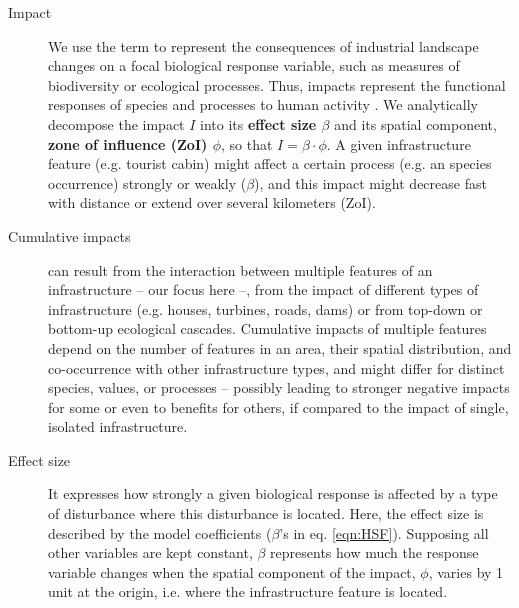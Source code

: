 \documentclass[titlepage]{article}
\begin{document}
\begin{tcolorbox}[width=1.3\textwidth,center,colback=yellow!5,colframe=yellow!75!black,title={Box 1 -- Definitions}]

\begin{description}

    \item[Impact] We use the term to represent the consequences of industrial landscape changes on a focal biological response variable, such as measures of biodiversity or ecological processes. Thus, impacts represent the functional responses of species and processes to human activity \citep{naugle_unifying_2011}. We analytically decompose the impact $I$ into its \textbf{effect size $\beta$} and its spatial component, \textbf{zone of influence (ZoI) $\phi$}, so that $I = \beta \cdot \phi$. A given infrastructure feature (e.g. tourist cabin) might affect a certain process (e.g. an species occurrence) strongly or weakly ($\beta$), and this impact might decrease fast with distance or extend over several kilometers (ZoI).
    
    \item[Cumulative impacts] can result from the interaction between multiple features of an infrastructure -- our focus here --, from the impact of different types of infrastructure (e.g. houses, turbines, roads, dams) or from top-down or bottom-up ecological cascades. Cumulative impacts of multiple features depend on the number of features in an area, their spatial distribution, and co-occurrence with other infrastructure types, and might differ for distinct species, values, or processes -- possibly leading to stronger negative impacts for some or even to benefits for others, if compared to the impact of single, isolated infrastructure.
    
    \item[Effect size] It expresses how strongly a given biological response is affected by a type of disturbance where this disturbance is located. Here, the effect size is described by the model coefficients ($\beta$'s in eq. \ref{eqn:HSF}). Supposing all other variables are kept constant, $\beta$ represents how much the response variable changes when the spatial component of the impact, $\phi$, varies by 1 unit at the origin, i.e. where the infrastructure feature is located.
    

\end{description}
\end{tcolorbox}
\end{document}
